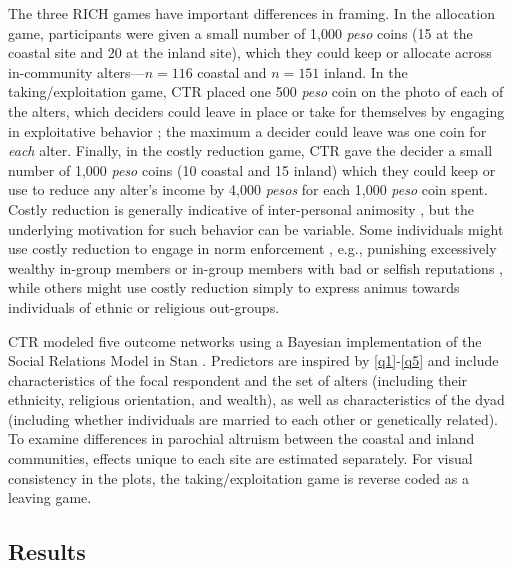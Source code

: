 \documentclass[bibauthoryear]{aa}
\begin{document}
The three RICH games have important differences in framing. In the allocation game, participants were given a small number of 1,000 \textit{peso} coins (15 at the coastal site and 20 at the inland site), which they could keep or allocate across in-community alters---$n=116$ coastal and $n=151$ inland. In the taking/exploitation game, CTR placed one 500 \textit{peso} coin on the photo of each of the alters, which deciders could leave in place or take for themselves by engaging in exploitative behavior \citep{bhui2019exploitation}; the maximum a decider could leave was one coin for \textit{each} alter. Finally, in the costly reduction game, CTR gave the decider a small number of 1,000 \textit{peso} coins (10 coastal and 15 inland) which they could keep or use to reduce any alter's income by 4,000 \textit{pesos} for each 1,000 \textit{peso} coin spent. Costly reduction is generally indicative 
of inter-personal animosity \citep{gervais2017rich}, but the underlying motivation for such behavior can be variable. Some individuals might use costly reduction to engage in  norm enforcement \citep{Fehr2002}, e.g., punishing excessively wealthy in-group members \citep{gervais2017rich, Pisor2020} or in-group members with bad or selfish reputations \citep{bhui2019exploitation}, while others might use costly reduction simply to express animus towards individuals of ethnic or religious out-groups. 

CTR modeled five outcome networks using a Bayesian implementation of the Social Relations Model \citep[SRM,][]{kenny1984social,  koster2019statistical}  in Stan \citep{Rstan2017xx}. Predictors are inspired by \ref{q1}-\ref{q5} and include characteristics of the focal respondent and the set of alters (including their ethnicity, religious orientation, and wealth), as well as characteristics of the dyad (including whether individuals are married to each other or genetically related). To examine differences in parochial altruism between the coastal and inland communities, effects unique to each site are estimated separately. For visual consistency in the plots, the taking/exploitation game is reverse coded as a leaving game. 

\subsection{Results}
\end{document}
